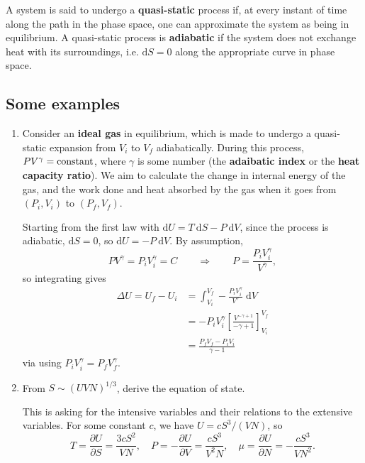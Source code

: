 \documentclass[letter-paper]{tufte-book}
\newcommand\Def[1]{\textbf{#1}}
\begin{document}
A system is said to undergo a \Def{quasi-static} process if, at every instant of
time along the path in the phase space, one can approximate the system as being
in equilibrium. A quasi-static process is \Def{adiabatic} if the system does not
exchange heat with its surroundings, i.e. $\mathrm{d}S = 0$ along the
appropriate curve in phase space.


\subsection{Some examples}

\begin{enumerate}
  \item Consider an \Def{ideal gas} in equilibrium, which is
  made to undergo a quasi-static expansion from $V_i$ to $V_f$ adiabatically.
  During this process, $PV^\gamma = \textnormal{constant}$, where $\gamma$ is
  some number (the \Def{adaibatic index} or the \Def{heat capacity ratio}). We
  aim to calculate the change in internal energy of the gas, and the work done
  and heat absorbed by the gas when it goes from $(P_i, V_i)$ to $(P_f, V_f)$.

  Starting from the first law with $\mathrm{d}U = T\ \mathrm{d}S - P\
  \mathrm{d}V$, since the process is adiabatic, $\mathrm{d}S = 0$, so $\mathrm{d}U
  = - P\ \mathrm{d}V$. By assumption,
  \begin{equation*}
    PV^\gamma = P_i V_i^\gamma = C \qquad \Rightarrow \qquad P = \frac{P_i
    V_i^\gamma}{V^\gamma},
  \end{equation*}
  so integrating gives
  \begin{align*}
    \Delta U = U_f - U_i &= \int_{V_i}^{V_f} - \frac{P_i V_i^\gamma}{V^\gamma}\; \mathrm{d}V \\
      &= -P_i V_i^\gamma \left[\frac{V^{-\gamma + 1}}{-\gamma + 1}\right]^{V_f}_{V_i}\\
      &= \frac{P_f V_f - P_i V_i}{\gamma - 1}
  \end{align*}
  via using $P_i V_i^\gamma = P_f V_f^\gamma$.

  \item From $S \sim (UVN)^{1/3}$, derive the equation of state.

  This is asking for the intensive variables and their relations to the
  extensive variables. For some constant $c$, we have $U = cS^3 / (VN)$, so
  \begin{equation*}
    T = \frac{\partial U}{\partial S} = \frac{3cS^2}{VN}, \quad
    P = -\frac{\partial U}{\partial V} = \frac{cS^3}{V^2 N}, \quad
    \mu = \frac{\partial U}{\partial N} = -\frac{cS^3}{VN^2}.
  \end{equation*}


\end{enumerate}
\end{document}
